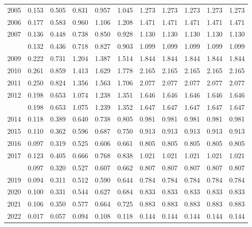\documentclass[
]{article}
\begin{document}
\begin{longtable}[t]{lrrrrrrrrrr}
2005 & 0.153 & 0.505 & 0.831 & 0.957 & 1.045 & 1.273 & 1.273 & 1.273 & 1.273 & 1.273\\
2006 & 0.177 & 0.583 & 0.960 & 1.106 & 1.208 & 1.471 & 1.471 & 1.471 & 1.471 & 1.471\\
2007 & 0.136 & 0.448 & 0.738 & 0.850 & 0.928 & 1.130 & 1.130 & 1.130 & 1.130 & 1.130\\
\addlinespace
2008 & 0.132 & 0.436 & 0.718 & 0.827 & 0.903 & 1.099 & 1.099 & 1.099 & 1.099 & 1.099\\
2009 & 0.222 & 0.731 & 1.204 & 1.387 & 1.514 & 1.844 & 1.844 & 1.844 & 1.844 & 1.844\\
2010 & 0.261 & 0.859 & 1.413 & 1.629 & 1.778 & 2.165 & 2.165 & 2.165 & 2.165 & 2.165\\
2011 & 0.250 & 0.824 & 1.356 & 1.563 & 1.706 & 2.077 & 2.077 & 2.077 & 2.077 & 2.077\\
2012 & 0.198 & 0.653 & 1.074 & 1.238 & 1.351 & 1.646 & 1.646 & 1.646 & 1.646 & 1.646\\
\addlinespace
2013 & 0.198 & 0.653 & 1.075 & 1.239 & 1.352 & 1.647 & 1.647 & 1.647 & 1.647 & 1.647\\
2014 & 0.118 & 0.389 & 0.640 & 0.738 & 0.805 & 0.981 & 0.981 & 0.981 & 0.981 & 0.981\\
2015 & 0.110 & 0.362 & 0.596 & 0.687 & 0.750 & 0.913 & 0.913 & 0.913 & 0.913 & 0.913\\
2016 & 0.097 & 0.319 & 0.525 & 0.606 & 0.661 & 0.805 & 0.805 & 0.805 & 0.805 & 0.805\\
2017 & 0.123 & 0.405 & 0.666 & 0.768 & 0.838 & 1.021 & 1.021 & 1.021 & 1.021 & 1.021\\
\addlinespace
2018 & 0.097 & 0.320 & 0.527 & 0.607 & 0.662 & 0.807 & 0.807 & 0.807 & 0.807 & 0.807\\
2019 & 0.094 & 0.311 & 0.512 & 0.590 & 0.644 & 0.784 & 0.784 & 0.784 & 0.784 & 0.784\\
2020 & 0.100 & 0.331 & 0.544 & 0.627 & 0.684 & 0.833 & 0.833 & 0.833 & 0.833 & 0.833\\
2021 & 0.106 & 0.350 & 0.577 & 0.664 & 0.725 & 0.883 & 0.883 & 0.883 & 0.883 & 0.883\\
2022 & 0.017 & 0.057 & 0.094 & 0.108 & 0.118 & 0.144 & 0.144 & 0.144 & 0.144 & 0.144\\*
\end{longtable}
\end{document}
